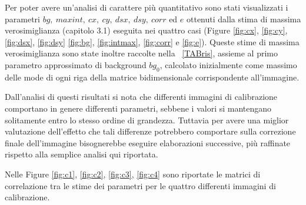 Per poter avere un'analisi di carattere più quantitativo sono stati visualizzati i parametri $bg,\ maxint,\ cx,\ cy,\ dsx,\ dsy,\ corr$ ed $e$ ottenuti dalla stima di massima verosimiglianza (capitolo 3.1) eseguita nei quattro casi (Figure \ref{fig:cx}, \ref{fig:cy}, \ref{fig:dsx}, \ref{fig:dsy} \ref{fig:bg}, \ref{fig:intmax}, \ref{fig:corr} e \ref{fig:e}).
Queste stime di massima verosimiglianza sono state inoltre raccolte nella \tablename~\ref{TABris}, assieme al primo parametro approssimato di background $bg_0$, calcolato inizialmente come massimo delle mode di ogni riga della matrice bidimensionale corrispondente all'immagine.

Dall'analisi di questi risultati si nota che differenti immagini di calibrazione comportano in genere differenti parametri, sebbene i valori si mantengano solitamente entro lo stesso ordine di grandezza.
Tuttavia per avere una miglior valutazione dell'effetto che tali differenze potrebbero comportare sulla correzione finale dell'immagine bisognerebbe eseguire elaborazioni successive, più raffinate rispetto alla semplice analisi qui riportata.

Nelle Figure \ref{fig:c1}, \ref{fig:c2}, \ref{fig:c3}, \ref{fig:c4} sono riportate le matrici di correlazione tra le stime dei parametri per le quattro differenti immagini di calibrazione.

